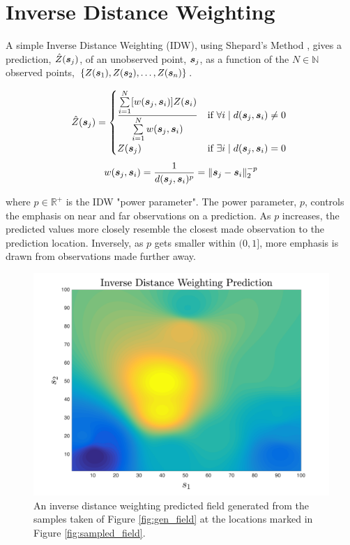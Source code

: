 \section{Inverse Distance Weighting} \label{sec:idw_intro}
A simple Inverse Distance Weighting (IDW), using Shepard's Method \cite{shepard:idw}, gives a prediction, $\hat{Z}({\it{\boldsymbol{s}}}_j)$, of an unobserved point, ${\it{\boldsymbol{s}}}_j$, as a function of the $N \in \mathbb{N}$ observed points, $\{Z({\it{\boldsymbol{s}}}_1), Z({\it{\boldsymbol{s}}}_2), \hdots, Z({\it{\boldsymbol{s}}}_n) \}$.

\begin{equation}
	\hat{Z}({\it{\boldsymbol{s}}}_j)=\begin{cases}
			\dfrac{\sum\limits_{i=1}^N [w({\it{\boldsymbol{s}}}_j, {\it{\boldsymbol{s}}}_i)] Z({\it{\boldsymbol{s}}}_i) }{\sum\limits_{i=1}^{N} w({\it{\boldsymbol{s}}}_j, {\it{\boldsymbol{s}}}_i)} & \text{if}\ \forall i \mid d({\it{\boldsymbol{s}}}_j,{\it{\boldsymbol{s}}}_i) \neq 0\ \\
			Z({\it{\boldsymbol{s}}}_j) & \text{if}\ \exists i \mid d({\it{\boldsymbol{s}}}_j,{\it{\boldsymbol{s}}}_i)=0\\
		\end{cases}
\end{equation}
\begin{equation}
	w({\it{\boldsymbol{s}}}_j, {\it{\boldsymbol{s}}}_i)=\frac{1}{d({\it{\boldsymbol{s}}}_j,{\it{\boldsymbol{s}}}_{i})^{p}}=\|{\it{\boldsymbol{s}}}_j-{\it{\boldsymbol{s}}}_i\|_{2}^{-p}
\end{equation}

where $p \in \mathbb{R}^{+}$ is the IDW "power parameter". The power parameter, $p$, controls the emphasis on near and far observations on a prediction. As $p$ increases, the predicted values more closely resemble the closest made observation to the prediction location. Inversely, as $p$ gets smaller within $(0, 1]$, more emphasis is drawn from observations made further away.\\

\begin{figure}[ht!]
    \centering
    \includegraphics[width=0.8\linewidth]{figures/idw_predicted_field.png}
    \caption{An inverse distance weighting predicted field generated from the samples taken of Figure \ref{fig:gen_field} at the locations marked in Figure \ref{fig:sampled_field}.}
    \label{fig:idw_field}
\end{figure}

